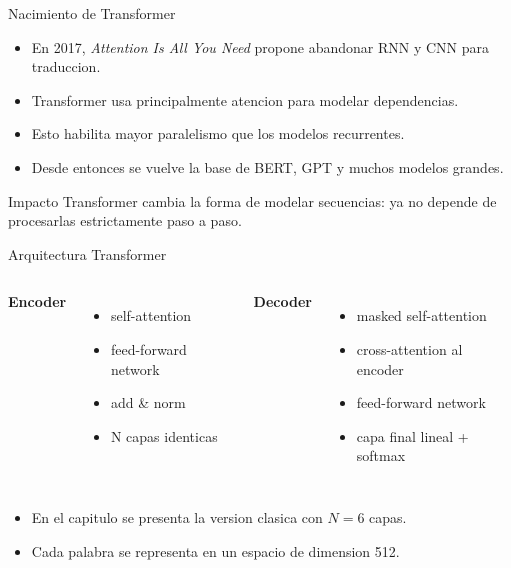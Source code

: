 \documentclass[aspectratio=169]{beamer}
\begin{document}
\begin{frame}{Nacimiento de Transformer}
  \begin{itemize}
    \item En 2017, \textit{Attention Is All You Need} propone abandonar RNN y CNN para traduccion.
    \item Transformer usa principalmente atencion para modelar dependencias.
    \item Esto habilita mayor paralelismo que los modelos recurrentes.
    \item Desde entonces se vuelve la base de BERT, GPT y muchos modelos grandes.
  \end{itemize}
  \vspace{0.2cm}
  \begin{block}{Impacto}
    Transformer cambia la forma de modelar secuencias: ya no depende de procesarlas estrictamente paso a paso.
  \end{block}
\end{frame}

\begin{frame}{Arquitectura Transformer}
  \begin{columns}[T]
      \textbf{Encoder}
      \begin{itemize}
        \item self-attention
        \item feed-forward network
        \item add \& norm
        \item N capas identicas
      \end{itemize}
      \textbf{Decoder}
      \begin{itemize}
        \item masked self-attention
        \item cross-attention al encoder
        \item feed-forward network
        \item capa final lineal + softmax
      \end{itemize}
  \end{columns}
  \vspace{0.2cm}
  \begin{itemize}
    \item En el capitulo se presenta la version clasica con \(N = 6\) capas.
    \item Cada palabra se representa en un espacio de dimension 512.
  \end{itemize}
\end{frame}
\end{document}
